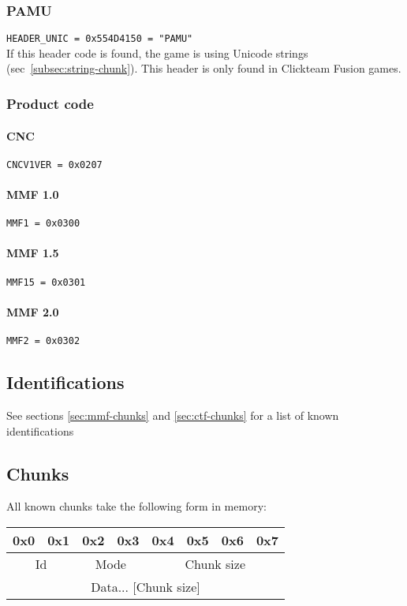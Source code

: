 \documentclass{article}
\begin{document}
\subsubsection{PAMU}
\label{subsubsec:PAMU}
\verb|HEADER_UNIC = 0x554D4150 = "PAMU"|
\\
If this header code is found, the game is using Unicode strings
(sec~\ref{subsec:string-chunk}).
This header is only found in Clickteam Fusion games.

\subsubsection{Product code}

\paragraph{CNC}
\verb|CNCV1VER = 0x0207|

\paragraph{MMF 1.0}
\verb|MMF1 = 0x0300|

\paragraph{MMF 1.5}
\verb|MMF15 = 0x0301|

\paragraph{MMF 2.0}
\verb|MMF2 = 0x0302|

\subsection{Identifications}
See sections \ref{sec:mmf-chunks} and \ref{sec:ctf-chunks} for a list of known
identifications

\subsection{Chunks}
\label{subsec:chunks}

All known chunks take the following form in memory:
\\
\begin{tabular}{c|c|c|c|c|c|c|c}
  0x0 & 0x1 & 0x2 & 0x3 & 0x4 & 0x5 & 0x6 & 0x7
  \\ \hline
  \multicolumn{2}{|c|}{Id} &
  \multicolumn{2}{|c|}{Mode} &
  \multicolumn{4}{|c|}{Chunk size}
  \\ \hline
  \multicolumn{8}{|c}{Data... [Chunk size]}
  \\ \hline
\end{tabular}
\end{document}

